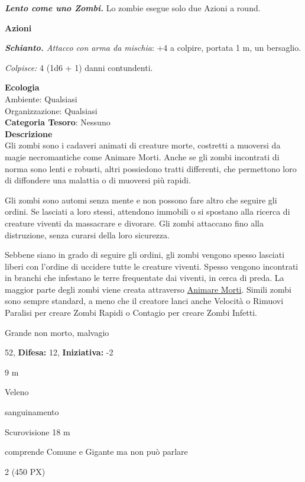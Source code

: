 \begin{multicols}{2}
{\emph{\textbf{Lento come uno Zombi.}} Lo zombie esegue solo due Azioni a round.

\textbf{Azioni}

\emph{\textbf{Schianto.} Attacco con arma da mischia}: +4 a colpire, portata 1 m, un bersaglio.

\emph{Colpisce:} 4 (1d6 + 1) danni contundenti.

\textbf{Ecologia}\\
Ambiente: Qualsiasi\\
Organizzazione: Qualsiasi\\
\textbf{Categoria Tesoro}: Nessuno\\
\textbf{Descrizione}\\
Gli zombi sono i cadaveri animati di creature morte, costretti a muoversi da magie necromantiche come Animare Morti. Anche se gli zombi incontrati di norma sono lenti e robusti, altri possiedono tratti differenti, che permettono loro di diffondere una malattia o di muoversi più rapidi.

Gli zombi sono automi senza mente e non possono fare altro che seguire gli ordini. Se lasciati a loro stessi, attendono immobili o si spostano alla ricerca di creature viventi da massacrare e divorare. Gli zombi attaccano fino alla distruzione, senza curarsi della loro sicurezza.

Sebbene siano in grado di seguire gli ordini, gli zombi vengono spesso lasciati liberi con l'ordine di uccidere tutte le creature viventi. Spesso vengono incontrati in branchi che infestano le terre frequentate dai viventi, in cerca di preda. La maggior parte degli zombi viene creata attraverso \hyperlink{Animare Morti}{Animare Morti}. Simili zombi sono sempre standard, a meno che il creatore lanci anche Velocità o Rimuovi Paralisi per creare Zombi Rapidi o Contagio per creare Zombi Infetti.

\noindent
\begin{description}[noitemsep, topsep=0pt, parsep=0pt, partopsep=0pt, leftmargin=0cm, labelwidth=2.2cm]
	\item[\textbf{Taglia/Tipo:}] Grande non morto, malvagio
	\item[\textbf{Caratt.:}] 
	\item[\textbf{Punti Ferita:}] 52,  \textbf{Difesa:} 12,  \textbf{Iniziativa:} -2
	\item[\textbf{Movimento:}] 9 m
	\item[\textbf{Tiri Salvez.:}] 
	\item[\textbf{Imm. Danni:}] Veleno
	\item[\textbf{Immunità:}] sanguinamento
	\item[\textbf{Sensi:}] Scurovisione 18 m
	\item[\textbf{Linguaggi:}] comprende Comune e Gigante ma non può parlare
	\item[\textbf{Sfida:}] 2 (450 PX)\smallskip
\end{description}

}
\end{multicols}
